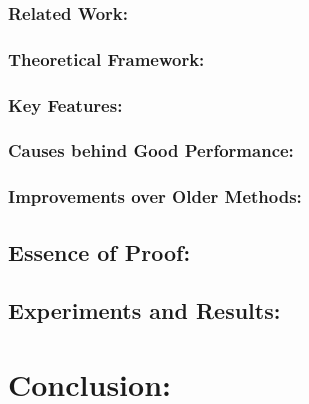 \documentclass[11pt]{article}
\begin{document}
		\subsubsection{Related Work:}
		
		\subsubsection{Theoretical Framework:}
		
		\subsubsection{Key Features:}
		
		\subsubsection{Causes behind Good Performance:}
		
		\subsubsection{Improvements over Older Methods:}
	
	\subsection{Essence of Proof:} %
	
	\subsection{Experiments and Results:}
	
\section{Conclusion:}
\end{document}
